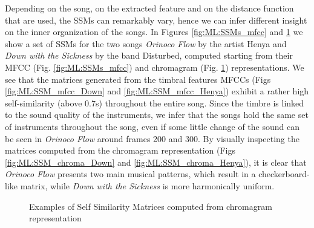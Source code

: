 Depending on the song, on the extracted feature and on the distance function that are used, the SSMs can remarkably vary, hence we can infer different insight on the inner organization of the songs. In Figures \ref{fig:ML:SSMs_mfcc} and \ref{fig:ML:SSMs_chroma}  we show a set of SSMs for the two songs \textit{Orinoco Flow} by the artist Henya and \textit{Down with the Sickness} by the band Disturbed, computed starting from their MFCC (Fig. \ref{fig:ML:SSMs_mfcc}) and chromagram (Fig. \ref{fig:ML:SSMs_chroma}) representations. We see that the matrices generated from the timbral features MFCCs (Figs  \ref{fig:ML:SSM_mfcc_Down} and  \ref{fig:ML:SSM_mfcc_Henya}) exhibit a rather high self-similarity (above $0.7$s) throughout the entire song. Since the timbre is linked to the sound quality of the instruments, we infer that the songs hold the same set of instruments throughout the song, even if some little change of the sound can be seen in \textit{Orinoco Flow} around frames 200 and 300. By visually inspecting the matrices computed from the chromagram representation (Figs  \ref{fig:ML:SSM_chroma_Down} and  \ref{fig:ML:SSM_chroma_Henya}), it is clear that \textit{Orinoco Flow} presents two main musical patterns, which result in a checkerboard-like matrix, while \textit{Down with the Sickness} is more harmonically uniform.

      

\begin{figure}[tb]
        \centering      
 	   \hfil
      \caption{Examples of Self Similarity Matrices computed from chromagram representation}
      \label{fig:ML:SSMs_chroma}         
\end{figure}

